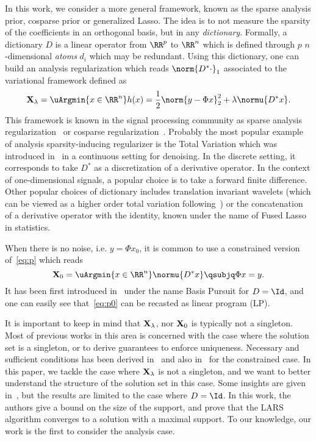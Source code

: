 In this work, we consider a more general framework, known as the sparse analysis prior, cosparse prior or generalized Lasso.
The idea is to not measure the sparsity of the coefficients in an orthogonal basis, but in any \emph{dictionary}.
Formally, a dictionary $D$ is a linear operator from $\RR^p$ to $\RR^n$ which is defined through $p$ $n$-dimensional \emph{atoms} $d_i$ which may be redundant.
Using this dictionary, one can build an analysis regularization which reads $\norm{D^* \cdot}_1$ associated to the variational framework defined as
\begin{equation}
  \label{eq:p}
  \Xl = \uArgmin{x \in \RR^n}h(x)= \frac{1}{2} \norm{y - \Phi x}_2^2 + \lambda \normu{D^* x} .
\end{equation}
This framework is known in the signal processing community as sparse analysis regularization~\cite{elad2007analysis,vaiter2011robust} or cosparse regularization~\cite{nam2012cosparse}.
Probably the most popular example of analysis sparsity-inducing regularizer is the Total Variation which was introduced in~\cite{rudin1992nonlinear} in a continuous setting for denoising.
In the discrete setting, it corresponds to take $D^*$ as a discretization of a derivative operator.
In the context of one-dimensional signals, a popular choice is to take a forward finite difference.
Other popular choices of dictionary includes translation invariant wavelets (which can be viewed as a higher order total variation following~\cite{steidl2004equivalence}) or the concatenation of a derivative operator with the identity, known under the name of Fused Lasso~\cite{tibshirani2005sparsity} in statistics.

When there is no noise, i.e. $y = \Phi x_0$, it is common to use a constrained version of~\eqref{eq:p} which reads
\begin{equation}
  \label{eq:p0}
  \Xo = \uArgmin{x \in \RR^n} \normu{D^* x} \qsubjq \Phi x = y .
\end{equation}
It has been first introduced in~\cite{chen1999atomi} under the name Basis
Pursuit for $D = \Id$, and one can easily see that~\eqref{eq:p0} can be recasted as linear program (LP).

It is important to keep in mind that $\mathbf{X}_{\lambda}$, nor $\mathbf{X}_{0}$ is typically not a singleton.
Most of previous works in this area is concerned with the case where the solution set is a singleton, or to derive guarantees to enforce uniqueness.
Necessary and sufficient conditions has been derived in~\cite{zhang2015necessary,zhang2013one} and also in~\cite{gilbert2015solution} for the constrained case.
In this paper, we tackle the case where $\mathbf{X}_{\lambda}$ is not a singleton, and we want to better understand the structure of the solution set in this case.
Some insights are given in~\cite{tibshirani2013uniqueness}, but the results are limited to the case where $D=\Id$.
In this work, the authors give a bound on the size of the support, and prove that the LARS algorithm converges to a solution with a maximal support.
To our knowledge, our work is the first to consider the analysis case.
